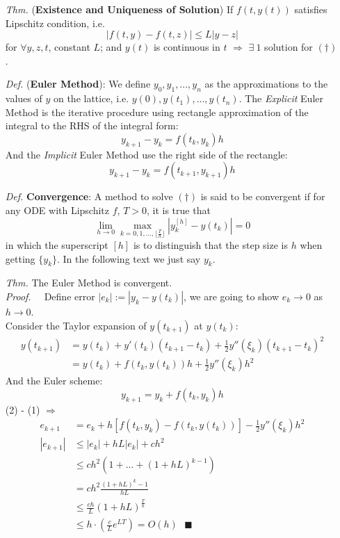 \documentclass[a4paper, 11pt]{article}
\begin{document}
\begin{itemize}
	\item[\textit{Thm.}] (\textbf{Existence and Uniqueness of Solution}) If $f(t,y(t))$ satisfies Lipschitz condition, i.e. 
	$$
	|f(t,y) - f(t,z)| \leq L|y-z|
	$$
	for $\forall y,z,t$, constant $L$; and $y(t)$ is continuous in $t$ $\Rightarrow$ $\exists~1$ solution for $(\dag)$.

	\item[\textit{Def.}] (\textbf{Euler Method}): We define $y_0, y_1, ..., y_n$ as the approximations to the values of $y$ on the lattice, i.e. $y(0), y(t_1), ..., y(t_n)$. The \emph{Explicit} Euler Method is the iterative procedure using rectangle approximation of the integral to the RHS of the integral form:
	$$
	y_{k+1} - y_{k} = f(t_k, y_k) h
	$$
	And the \emph{Implicit} Euler Method use the right side of the rectangle:
	$$
	y_{k+1} - y_{k} = f(t_{k+1}, y_{k+1}) h
	$$

	\item[\textit{Def.}] \textbf{Convergence}: A method to solve $(\dag)$ is said to be convergent if for any ODE with Lipschitz $f$, $T>0$, it is true that
	$$
	\lim\limits_{h\rightarrow0} \max\limits_{k=0,1,...,\lfloor\frac{T}{h}\rfloor} |y_k^{[h]} - y(t_k)| = 0
	$$
	in which the superscript $[h]$ is to distinguish that the step size is $h$ when getting $\{y_k\}$. In the following text we just say $y_k$.

	\item[\textit{Thm.}] The Euler Method is convergent.\\
	\textit{Proof.~~} Define error $|e_k| := |y_k-y(t_k)|$, we are going to show $e_k \to 0$ as $h\to 0$. \\
	Consider the Taylor expansion of $y(t_{k+1})$ at $y(t_k)$:
	\begin{equation}
		\begin{split}
			y(t_{k+1}) &= y(t_k) + y'(t_k)(t_{k+1}-t_k) + \frac{1}{2}y''(\xi_k)(t_{k+1}-t_k)^2 \\
					   &= y(t_k) + f(t_k, y(t_k))h + \frac{1}{2}y''(\xi_k)h^2
		\end{split}
	\end{equation}
	And the Euler scheme:
	\begin{equation}
		y_{k+1} = y_{k} + f(t_k, y_k) h
	\end{equation}
	(2) - (1) $\Rightarrow$
	\begin{equation}
		\begin{split}
			e_{k+1} &= e_k + h\left[f(t_k, y_k)-f(t_k, y(t_k))\right] - \frac{1}{2}y''(\xi_k)h^2 \\
			|e_{k+1}| &\leq |e_k| + hL|e_k| + ch^2 \\
			&\leq ch^2(1+...+(1+hL)^{k-1}) \\
			&=ch^2\frac{(1+hL)^k-1}{hL} \\
			&\leq \frac{ch}{L} (1+hL)^{\frac{T}{h}}\\
			&\leq h\cdot \left(\frac{c}{L}e^{LT}\right) = O(h)~~~\blacksquare
		\end{split}	
	\end{equation}


\end{itemize}
\end{document}
